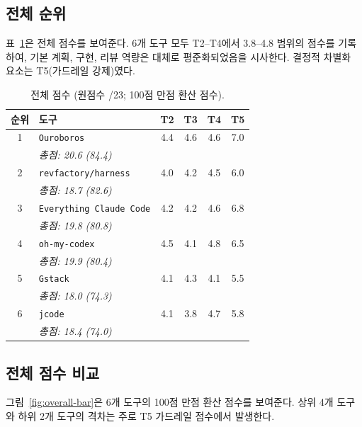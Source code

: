 \documentclass[11pt,a4paper]{article}
\newcommand{\tool}[1]{\texttt{#1}}
\begin{document}
\subsection{전체 순위}

표~\ref{tab:overall}은 전체 점수를 보여준다.
6개 도구 모두 T2--T4에서 3.8--4.8 범위의 점수를 기록하여, 기본 계획, 구현, 리뷰 역량은 대체로 평준화되었음을 시사한다.
결정적 차별화 요소는 T5(가드레일 강제)였다.

\begin{table}[t]
\centering
\caption{전체 점수 (원점수 /23; 100점 만점 환산 점수).}
\label{tab:overall}
\small
\begin{tabular}{@{}clcccc@{}}
\toprule
\textbf{순위} & \textbf{도구} & \textbf{T2} & \textbf{T3} & \textbf{T4} & \textbf{T5} \\
\midrule
1 & \tool{Ouroboros} & 4.4 & 4.6 & 4.6 & 7.0 \\
  & \emph{총점: 20.6 (84.4)} & & & & \\
2 & \tool{revfactory/harness} & 4.0 & 4.2 & 4.5 & 6.0 \\
  & \emph{총점: 18.7 (82.6)} & & & & \\
3 & \tool{Everything Claude Code} & 4.2 & 4.2 & 4.6 & 6.8 \\
  & \emph{총점: 19.8 (80.8)} & & & & \\
4 & \tool{oh-my-codex} & 4.5 & 4.1 & 4.8 & 6.5 \\
  & \emph{총점: 19.9 (80.4)} & & & & \\
5 & \tool{Gstack} & 4.1 & 4.3 & 4.1 & 5.5 \\
  & \emph{총점: 18.0 (74.3)} & & & & \\
6 & \tool{jcode} & 4.1 & 3.8 & 4.7 & 5.8 \\
  & \emph{총점: 18.4 (74.0)} & & & & \\
\bottomrule
\end{tabular}
\end{table}

\subsection{전체 점수 비교}

그림~\ref{fig:overall-bar}은 6개 도구의 100점 만점 환산 점수를 보여준다.
상위 4개 도구와 하위 2개 도구의 격차는 주로 T5 가드레일 점수에서 발생한다.
\end{document}
